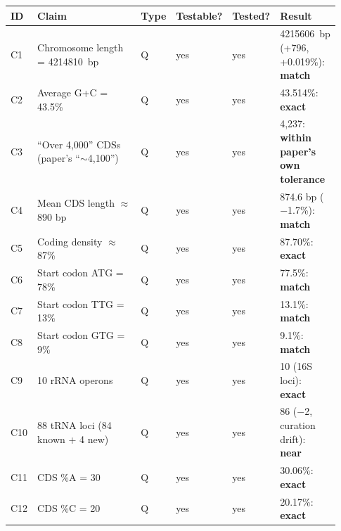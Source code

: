 \documentclass[11pt,letterpaper]{article}
\begin{document}
\begin{longtable}{@{}p{0.03\linewidth}p{0.55\linewidth}p{0.05\linewidth}p{0.12\linewidth}p{0.08\linewidth}p{0.10\linewidth}@{}}
\toprule
\textbf{ID} & \textbf{Claim} & \textbf{Type} & \textbf{Testable?} & \textbf{Tested?} & \textbf{Result} \\
\midrule
\endhead
C1  & Chromosome length = \SI{4214810}{bp}                                        & Q & yes                       & yes     & \SI{4215606}{bp} (+796, +0.019\%): \textbf{match} \\
C2  & Average G+C = 43.5\%                                                        & Q & yes                       & yes     & 43.514\%: \textbf{exact} \\
C3  & ``Over 4,000'' CDSs (paper's ``$\sim$4,100'')                                & Q & yes                       & yes     & 4,237: \textbf{within paper's own tolerance} \\
C4  & Mean CDS length $\approx$ 890 bp                                             & Q & yes                       & yes     & 874.6 bp ($-$1.7\%): \textbf{match} \\
C5  & Coding density $\approx$ 87\%                                                & Q & yes                       & yes     & 87.70\%: \textbf{exact} \\
C6  & Start codon ATG = 78\%                                                       & Q & yes                       & yes     & 77.5\%: \textbf{match} \\
C7  & Start codon TTG = 13\%                                                       & Q & yes                       & yes     & 13.1\%: \textbf{match} \\
C8  & Start codon GTG = 9\%                                                        & Q & yes                       & yes     & 9.1\%: \textbf{match} \\
C9  & 10 rRNA operons                                                              & Q & yes                       & yes     & 10 (16S loci): \textbf{exact} \\
C10 & 88 tRNA loci (84 known + 4 new)                                              & Q & yes                       & yes     & 86 ($-$2, curation drift): \textbf{near} \\
C11 & CDS \%A = 30                                                                 & Q & yes                       & yes     & 30.06\%: \textbf{exact} \\
C12 & CDS \%C = 20                                                                 & Q & yes                       & yes     & 20.17\%: \textbf{exact} \\

\end{longtable}
\end{document}

